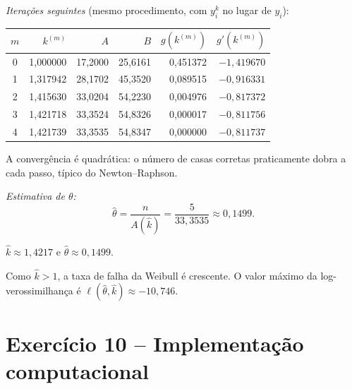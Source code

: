 \documentclass[11pt,a4paper]{article}
\theoremstyle{definition}
\theoremstyle{plain}
\begin{document}
\textit{Iterações seguintes} (mesmo procedimento, com $y_i^k$ no lugar de $y_i$):
\begin{center}
\begin{tabular}{@{}crrrrr@{}}
\toprule
$m$ & $k^{(m)}$ & $A$ & $B$ & $g(k^{(m)})$ & $g'(k^{(m)})$\\
\midrule
0 & 1,000000 & 17,2000 & 25,6161 & 0,451372 & $-1{,}419670$\\
1 & 1,317942 & 28,1702 & 45,3520 & 0,089515 & $-0{,}916331$\\
2 & 1,415630 & 33,0204 & 54,2230 & 0,004976 & $-0{,}817372$\\
3 & 1,421718 & 33,3524 & 54,8326 & 0,000017 & $-0{,}811756$\\
4 & 1,421739 & 33,3535 & 54,8347 & 0,000000 & $-0{,}811737$\\
\bottomrule
\end{tabular}
\end{center}
A convergência é quadrática: o número de casas corretas praticamente dobra a cada passo, típico do Newton--Raphson.

\textit{Estimativa de $\theta$:}
\[
\hat\theta=\frac{n}{A(\hat k)}=\frac{5}{33{,}3535}\approx0{,}1499 .
\]
\begin{resposta}
$\hat k\approx1{,}4217$ \quad e \quad $\hat\theta\approx0{,}1499$.

Como $\hat k>1$, a taxa de falha da Weibull é crescente. O valor máximo da log-verossimilhança é $\ell(\hat\theta,\hat k)\approx-10{,}746$.
\end{resposta}

\section{Exercício 10 -- Implementação computacional}
\end{document}
